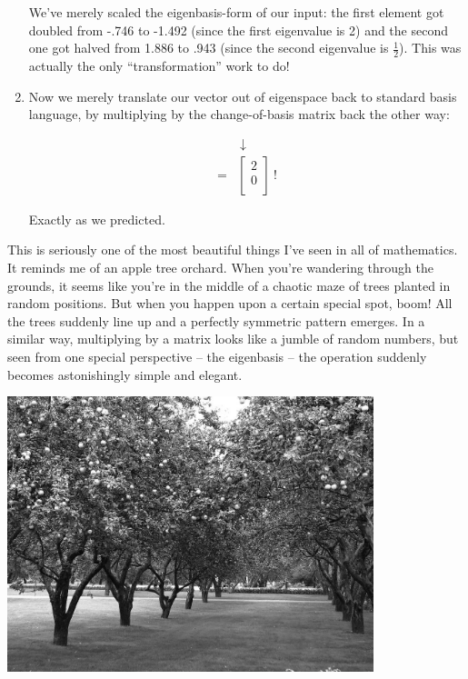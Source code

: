 \begin{enumerate}
We've merely scaled the eigenbasis-form of our input: the first element got
doubled from -.746 to -1.492 (since the first eigenvalue is 2) and the second
one got halved from 1.886 to .943 (since the second eigenvalue is
$\frac{1}{2}$). This was actually the only ``transformation'' work to do!

\item Now we merely translate our vector out of eigenspace back to standard
basis language, by multiplying by the change-of-basis matrix back the other way:

\vspace{-.15in}
\begin{align*}
& \ \downarrow \\
=
& \begin{bmatrix}
2 \\
0 \\
\end{bmatrix}\ !
\end{align*}
\vspace{-.15in}

Exactly as we predicted.

\end{enumerate}

\pagebreak

This is seriously one of the most beautiful things I've seen in all of
mathematics. It reminds me of an apple tree orchard. When you're wandering
through the grounds, it seems like you're in the middle of a chaotic maze of
trees planted in random positions. But when you happen upon a certain special
spot, boom! All the trees suddenly line up and a perfectly symmetric pattern
emerges. In a similar way, multiplying by a matrix looks like a jumble of
random numbers, but seen from one special perspective -- the eigenbasis -- the
operation suddenly becomes astonishingly simple and elegant.

\label{orchard}
\begin{center}
\includegraphics[width=0.8\textwidth]{orchard.jpg}
\end{center}

